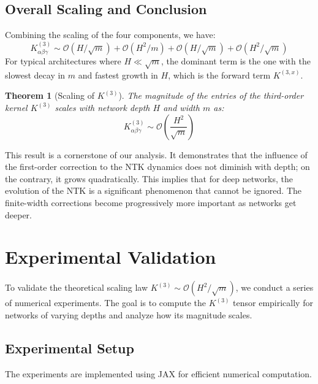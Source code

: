 \documentclass{article}
\newtheorem{theorem}{Theorem}[section]
\newcommand{\Order}{\mathcal{O}}
\begin{document}
\subsection{Overall Scaling and Conclusion}

Combining the scaling of the four components, we have:
\[
K^{(3)}_{\alpha\beta\gamma} \sim \Order(H/\sqrt{m}) + \Order(H^2/m) + \Order(H/\sqrt{m}) + \Order(H^2/\sqrt{m})
\]
For typical architectures where $H \ll \sqrt{m}$, the dominant term is the one with the slowest decay in $m$ and fastest growth in $H$, which is the forward term $K^{(3,x)}$.

\begin{theorem}[Scaling of $K^{(3)}$]
The magnitude of the entries of the third-order kernel $K^{(3)}$ scales with network depth $H$ and width $m$ as:
\begin{equation}
K^{(3)}_{\alpha\beta\gamma} \sim \Order\left(\frac{H^2}{\sqrt{m}}\right)
\end{equation}
\end{theorem}

This result is a cornerstone of our analysis. It demonstrates that the influence of the first-order correction to the NTK dynamics does not diminish with depth; on the contrary, it grows quadratically. This implies that for deep networks, the evolution of the NTK is a significant phenomenon that cannot be ignored. The finite-width corrections become progressively more important as networks get deeper.

\newpage
\section{Experimental Validation}

To validate the theoretical scaling law $K^{(3)} \sim \Order(H^2/\sqrt{m})$, we conduct a series of numerical experiments. The goal is to compute the $K^{(3)}$ tensor empirically for networks of varying depths and analyze how its magnitude scales.

\subsection{Experimental Setup}

The experiments are implemented using JAX for efficient numerical computation.
\end{document}
